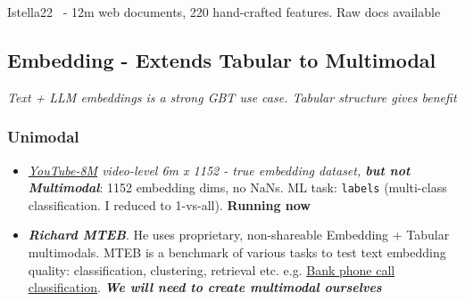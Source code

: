 \documentclass[11pt]{article}
\begin{document}
Istella22~\cite{dato_istella22_2022} - 12m web documents, 220 hand-crafted features. Raw docs available

\subsection{Embedding - Extends Tabular to Multimodal}
\textit{Text + LLM embeddings is a strong GBT use case. Tabular structure gives benefit \cite{jiang2026multimodal}}


\subsubsection{Unimodal}

\begin{itemize}
    \item \textit{\href{https://research.google.com/youtube8m/download.html}{YouTube-8M} video-level 6m x 1152 - true embedding dataset, \textbf{but not Multimodal}}: 1152 embedding dims, no NaNs. ML task: \texttt{labels} (multi-class classification. I reduced to 1-vs-all). \textbf{Running now}
    \item \textbf{\textit{Richard MTEB}}. He uses proprietary, non-shareable Embedding + Tabular multimodals. MTEB is a benchmark of various tasks to test text embedding quality: classification, clustering, retrieval etc. e.g. \href{https://mteb-leaderboard.hf.space/tasks/Banking77Classification}{Bank phone call classification}. \textbf{\textit{We will need to create multimodal ourselves}}
\end{itemize}
\end{document}
